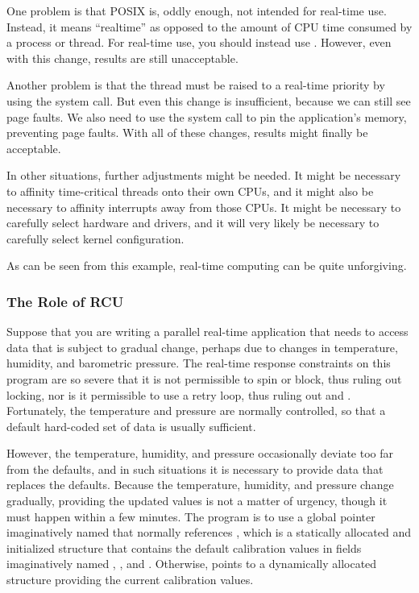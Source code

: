 One problem is that POSIX  is, oddly enough, not intended
for real-time use.
Instead, it means ``realtime'' as opposed to the amount of CPU time
consumed by a process or thread.
For real-time use, you should instead use .
However, even with this change, results are still unacceptable.

Another problem is that the thread must be raised to a real-time
priority by using the  system call.
But even this change is insufficient, because we can still see
page faults.
We also need to use the  system call to pin the
application's memory, preventing page faults.
With all of these changes, results might finally be acceptable.

In other situations, further adjustments might be needed.
It might be necessary to affinity time-critical threads onto their
own CPUs, and it might also be necessary to affinity interrupts
away from those CPUs.
It might be necessary to carefully select hardware and drivers,
and it will very likely be necessary to carefully select kernel
configuration.

As can be seen from this example, real-time computing can be quite
unforgiving.

\subsubsection{The Role of RCU}
\label{sec:advsync:The Role of RCU}

Suppose that you are writing a parallel real-time application that needs
to access
data that is subject to gradual change, perhaps due to changes in
temperature, humidity, and barometric pressure.
The real-time response constraints on this program are so severe that
it is not permissible to spin or block, thus ruling out locking,
nor is it permissible to use a retry loop, thus ruling out
 and .
Fortunately, the temperature and pressure are normally controlled,
so that a default hard-coded set of data is usually sufficient.

However, the temperature, humidity, and pressure occasionally deviate too far
from the defaults, and in such situations it is necessary to provide
data that replaces the defaults.
Because the temperature, humidity, and pressure change gradually,
providing the updated values is not a matter of urgency, though
it must happen within a few minutes.
The program is to use a global pointer imaginatively named 
that normally references , which is a statically allocated
and initialized structure that contains the default calibration values
in fields imaginatively named , , and .
Otherwise,  points to a dynamically allocated
structure providing the current calibration values.

